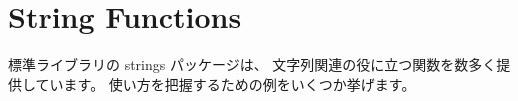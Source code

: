 \section{String Functions}

標準ライブラリの strings パッケージは、 文字列関連の役に立つ関数を数多く提供しています。 使い方を把握するための例をいくつか挙げます。




